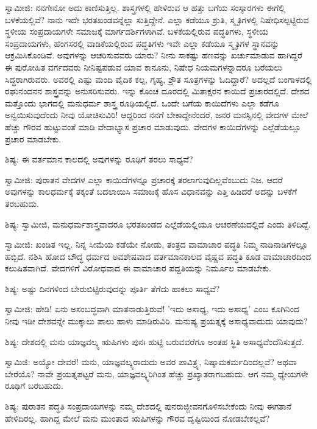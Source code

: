 ಸ್ವಾಮೀಜಿ: ನನಗೇನೋ ಅದು ಕಾಣಿಸುತ್ತಿಲ್ಲ. ಶಾಸ್ತ್ರಗಳಲ್ಲಿ ಹೇಳಿರುವ ಆ ಹತ್ತು ಬಗೆಯ ಸಂಸ್ಕಾರಗಳು ಈಗೆಲ್ಲಿ ಬಳಕೆಯಲ್ಲಿವೆ? ನಾನು ಇದೇ ಭರತಖಂಡವನ್ನೆಲ್ಲಾ ಸುತ್ತಿದ್ದೇನೆ. ಎಲ್ಲಾ ಕಡೆಯೂ ಶ್ರುತಿ, ಸ್ಮೃತಿಗಳಲ್ಲಿ ನಿಷೇಧಿಸಲ್ಪಟ್ಟಿರುವ ಸ್ಥಳೀಯ ಸಂಪ್ರದಾಯಗಳೇ ಸಮಾಜಕ್ಕೆ ಮಾರ್ಗದರ್ಶಿಗಳಾಗಿವೆ. ಬಳಕೆಯಲ್ಲಿರುವ ಪದ್ಧತಿಗಳು, ಸ್ಥಳೀಯ ಸಂಪ್ರದಾಯಗಳು, ಹೆಂಗಸರಲ್ಲಿ ವಾಡಿಕೆಯಲ್ಲಿರುವ ಪದ್ಧತಿಗಳು ಇವೇ ಎಲ್ಲಾ ಕಡೆಯೂ ಸ್ಮೃತಿಗಳ ಸ್ಥಾನವನ್ನು ಆಕ್ರಮಿಸಿಕೊಂಡಿವೆ. ಅವುಗಳನ್ನು ಆಚರಿಸುವವರು ಯಾರು? ನೀನು ಸಾಕಷ್ಟು ಹಣವನ್ನು ಖರ್ಚುಮಾಡುವ ಹಾಗಿದ್ದರೆ ಈ ಪುರೋಹಿತ ವರ್ಗದವರು ನೀನಿಷ್ಟಪಡುವ ಯಾವ ಕಾನೂನು, ನಿಷೇಧ ನಿಯಮಗಳನ್ನಾದರೂ ಬರೆಯಲು ಸಿದ್ಧರಾಗಿರುವರು. ಅವರಲ್ಲಿ ಎಷ್ಟು ಮಂದಿ ವೈದಿಕ ಕಲ್ಪ, ಗೃಹ್ಯ, ಶ್ರೌತ ಸೂತ್ರಗಳನ್ನು ಓದಿದ್ದಾರೆ? ಅದಲ್ಲದೆ ಬಂಗಾಳದಲ್ಲಿ ರಘುನಂದನನ ಶಾಸ್ತ್ರವನ್ನು ಅನುಸರಿಸುವರು. ಇನ್ನು ಕೊಂಚ ದೂರದಲ್ಲಿ ಮಿತಾಕ್ಷರನ ಕಾಯಿದೆ ಪ್ರಚಾರದಲ್ಲಿದೆ. ದೇಶದ ಮತ್ತೊಂದು ಭಾಗದಲ್ಲಿ ಮನುಧರ್ಮ ಶಾಸ್ತ್ರ ರೂಢಿಯಲ್ಲಿದೆ. ಒಂದೇ ಬಗೆಯ ಕಾಯಿದೆಗಳು ಎಲ್ಲಾ ಕಡೆಗೂ ಅನ್ವಯಿಸುವುದೆಂದು ನೀವು ಯೋಚಿಸುವಿರಿ! ಆದ್ದರಿಂದ ನನಗೆ ಬೇಕಾದ್ದೇನೆಂದರೆ, ಜನರ ಮನಸ್ಸಿನಲ್ಲಿ ವೇದಗಳ ಮೇಲೆ ಹೆಚ್ಚು ಗೌರವ ಹುಟ್ಟುವಂತೆ ಮಾಡಿ ವೇದಾಭ್ಯಾಸ ಪ್ರಚಾರ ಮಾಡುವುದು. ವೇದಗಳ ಕಾಯಿದೆಗಳನ್ನು ಎಲ್ಲೆಡೆಯಲ್ಲೂ ಪ್ರಚಾರ ಮಾಡಬೇಕು.

ಶಿಷ್ಯ: ಈ ವರ್ತಮಾನ ಕಾಲದಲ್ಲಿ ಅವುಗಳನ್ನು ರೂಢಿಗೆ ತರಲು ಸಾಧ್ಯವೆ?

ಸ್ವಾಮೀಜಿ: ಪುರಾತನ ವೇದಗಳ ಎಲ್ಲಾ ಕಾಯಿದೆಗಳನ್ನೂ ಪ್ರಚಾರಕ್ಕೆ ತರಲಾಗುವುದಿಲ್ಲವೆಂಬುದು ನಿಜ. ಆದರೆ ಅವುಗಳನ್ನು ಕಾಲಧರ್ಮಕ್ಕೆ ತಕ್ಕಂತೆ ಬದಲಾಯಿಸಿ ಸಮಾಜಕ್ಕೆ ಹೊಸ ವಿಧಾನವನ್ನು ಎತ್ತಿ ಹಿಡಿದರೆ ಅದನ್ನು ಬಳಕೆಗೆ ತರಬಹುದು.

ಶಿಷ್ಯ: ಸ್ವಾಮೀಜಿ, ಮನುಧರ್ಮಶಾಸ್ತ್ರವಾದರೂ ಭರತಖಂಡದ ಎಲ್ಲೆಡೆಯಲ್ಲಿಯೂ ಆಚರಣೆಯದಲ್ಲಿದೆ ಎಂದು ತಿಳಿದಿದ್ದೆ.

ಸ್ವಾಮೀಜಿ: ಖಂಡಿತ ಇಲ್ಲ. ನಿನ್ನ ಸೀಮೆಯ ಕಡೆಯೇ ನೋಡು, ತಂತ್ರದ ವಾಮಾಚಾರ ಪದ್ಧತಿ ನಿಮ್ಮ ನಾಡಿನಾಡಿಗಳಲ್ಲೂ ಹಬ್ಬಿದೆ. ನಶಿಸಿ ಹೋದ ಬೌದ್ಧ ಧರ್ಮದ ಅವಶೇಷವಾದ ವರ್ತಮಾನಕಾಲದ ವೈಷ್ಣವ ಪದ್ಧತಿ ಕೂಡ ವಾಮಾಚಾರದಿಂದ ಕಲುಷಿತವಾಗಿದೆ. ವೇದಗಳಿಗೆ ವಿರೋಧವಾದ ಈ ವಾಮಾಚಾರ ಪದ್ದತಿಯನ್ನು ನಿರ್ಮೂಲ ಮಾಡಬೇಕು.

ಶಿಷ್ಯ: ಅಷ್ಟು ದಿನಗಳಿಂದ ಬೇರುಬಿಟ್ಟಿರುವುದನ್ನು ಪೂರ್ತಿ ತೆಗೆದು ಹಾಕಲು ಸಾಧ್ಯವೆ?

ಸ್ವಾಮೀಜಿ: ಹೇಡಿ! ಏನು ಅಸಂಬದ್ಧವಾಗಿ ಮಾತನಾಡುತ್ತಿರುವೆ! 'ಇದು ಅಸಾಧ್ಯ, ಇದು ಅಸಾಧ್ಯ' ಎಂಬ ಕೂಗಿನಿಂದ ನೀವು ಇಡೀ ದೇಶವನ್ನೇ ಮುಕ್ಕಾಲು ಪಾಲು ಹಾಳು ಮಾಡಿರುವಿರಿ. ಮನುಷ್ಯ ಪ್ರಯತ್ನಕ್ಕೆ ಅಸಾಧ್ಯವಾದುದು ಯಾವುದು?

ಶಿಷ್ಯ: ದೇಶದಲ್ಲಿ ಮನು ಯಾಜ್ಞವಲ್ಕ್ಯ ಋಷಿಗಳು ಪುನಃ ಹುಟ್ಟಿ ಬರುವವರೆಗೂ ಅಂತಹ ಸ್ಥಿತಿ ಅಸಾಧ್ಯವೆಂದೆನಿಸುತ್ತದೆ.

ಸ್ವಾಮಿಜಿ: ಅಯ್ಯೋ ದೇವರೆ! ಮನು, ಯಾಜ್ಞವಲ್ಕ್ಯರಾದುದು ಅವರ ಪಾವಿತ್ರ್ಯ, ನಿಷ್ಕಾಮಕರ್ಮದಿಂದಲ್ಲವೆ? ಅಥವಾ ಬೇರೆಯೊ? ನಾವೇ ಪ್ರಯತ್ನಪಟ್ಟರೆ ಮನು, ಯಾಜ್ಞವಲ್ಕ್ಯರಿಗಿಂತ ಹೆಚ್ಚು ಪ್ರಖ್ಯಾತರಾಗಬಹುದು. ಆಗ ನಮ್ಮ ಧ್ಯೇಯಗಳೇ ರೂಢಿಗೆ ಬರಬಹುದು.

ಶಿಷ್ಯ: ಪುರಾತನ ಪದ್ಧತಿ ಸಂಪ್ರದಾಯಗಳನ್ನು ನಮ್ಮ ದೇಶದಲ್ಲಿ ಪುನರುಜ್ಜೀವನಗೊಳಿಸಬೇಕೆಂದು ನೀವು ಈಗತಾನೆ ಹೇಳಿದಿರಲ್ಲ. ಹಾಗಿದ್ದ ಮೇಲೆ ಮನು ಮುಂತಾದ ಋಷಿಗಳನ್ನು ಗೌರವ ದೃಷ್ಟಿಯಿಂದ ನೋಡಬೇಕಲ್ಲವೆ?

